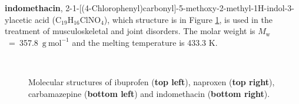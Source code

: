 \textbf{indomethacin}, 2-{1-[(4-Chlorophenyl)carbonyl]-5-methoxy-2-methyl-1H-indol-3-yl}acetic acid (C$_{19}$H$_{16}$ClNO$_{4}$), which structure is in Figure \ref{fig:APIs}, is used in the treatment of musculoskeletal and joint disorders. The molar weight is $M_\mathrm{w}$~=~357.8~$\mathrm{g\ mol^{-1}}$ and the melting temperature is 433.3 K. \cite{stejfa_heat_2021}
\begin{figure}[htb!]
	\hspace{1.2cm}
	\hspace{2cm}
	\\
	\caption{Molecular structures of ibuprofen (\textbf{top left}), naproxen (\textbf{top right}), carbamazepine (\textbf{bottom left}) and indomethacin (\textbf{bottom right}).}
	\label{fig:APIs}
\end{figure}


